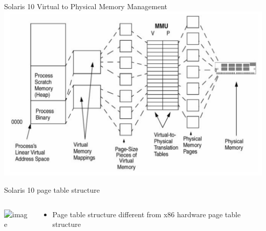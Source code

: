 \documentclass[aspectratio=169]{beamer}
\newcommand{\bi}{\begin{itemize}}
\newcommand{\ei}{\end{itemize}}
\begin{document}
\begin{frame}{Solaris 10 Virtual to Physical Memory Management}
\includegraphics[scale=0.20]{./figures/openindiana_mmu.jpg}
\end{frame}

\begin{frame}{Solaris 10 page table structure}
    \begin{columns}[T]
        \begin{column}{0.6\textwidth}
            \includegraphics<1->[scale=0.15]{./figures/page_structure.png}
        \end{column}
        \begin{column}{0.4\textwidth}
            \bi
                \item Page table structure different from x86 hardware page table
                    structure
            \ei
        \end{column}
    \end{columns}
\end{frame}

\end{document}
